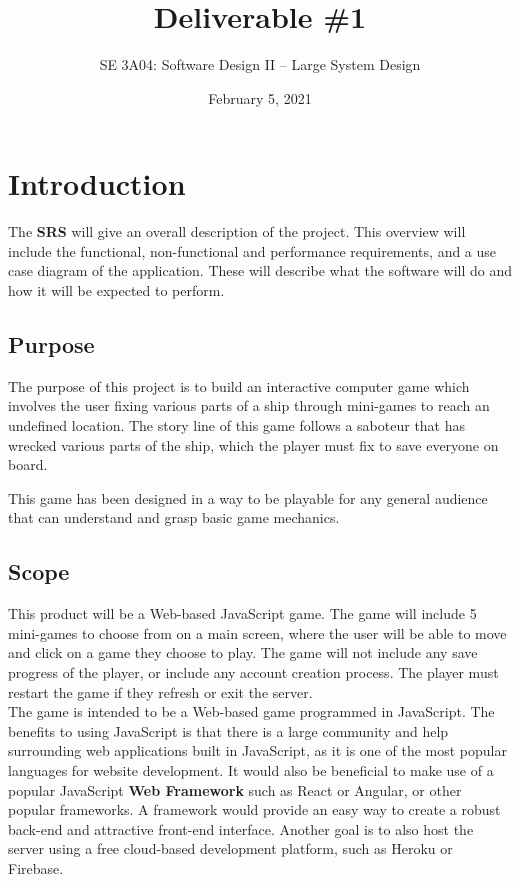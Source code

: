 \documentclass[]{article}
\title{Deliverable \#1}
\author{SE 3A04: Software Design II -- Large System Design}
\date{February 5, 2021}
\begin{document}
\maketitle	

\section{Introduction}
\label{sec:introduction}
The \textbf{SRS} will give an overall description of the project. This overview will include the functional, non-functional and performance requirements, and a use case diagram of the application. These will describe what the software will do and how it will be expected to perform.

\subsection{Purpose}
\label{sub:purpose}
The purpose of this project is to build an interactive computer game which involves the user fixing various parts of a ship through mini-games to reach an undefined location. The story line of this game follows a saboteur that has wrecked various parts of the ship, which the player must fix to save everyone on board.

This game has been designed in a way to be playable for any general audience that can understand and grasp basic game mechanics.

\subsection{Scope}
\label{sub:scope}
This product will be a Web-based JavaScript game. The game will include 5 mini-games to choose from on a main screen, where the user will be able to move and click on a game they choose to play. The game will not include any save progress of the player, or include any account creation process. The player must restart the game if they refresh or exit the server.
\\

The game is intended to be a Web-based game programmed in JavaScript. The benefits to using JavaScript is that there is a large community and help surrounding web applications built in JavaScript, as it is one of the most popular languages for website development. It would also be beneficial to make use of a popular JavaScript \textbf{Web Framework} such as React or Angular, or other popular frameworks. A framework would provide an easy way to create a robust back-end and attractive front-end interface. Another goal is to also host the server using a free cloud-based development platform, such as Heroku or Firebase.
\end{document}
